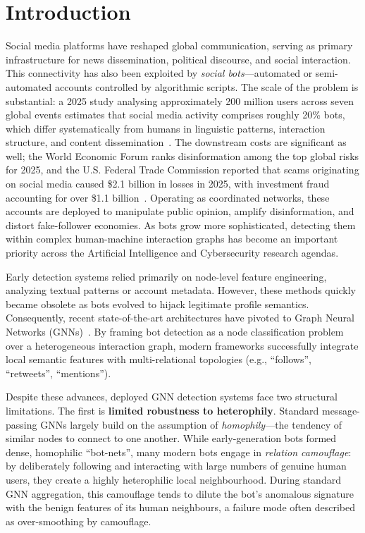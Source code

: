 \section{Introduction}

Social media platforms have reshaped global communication, serving as primary infrastructure for news dissemination, political discourse, and social interaction. This connectivity has also been exploited by \textit{social bots}---automated or semi-automated accounts controlled by algorithmic scripts. The scale of the problem is substantial: a 2025 study analysing approximately 200 million users across seven global events estimates that social media activity comprises roughly 20\% bots, which differ systematically from humans in linguistic patterns, interaction structure, and content dissemination~\cite{ng2025socialbots}. The downstream costs are significant as well; the World Economic Forum ranks disinformation among the top global risks for 2025, and the U.S. Federal Trade Commission reported that scams originating on social media caused \$2.1 billion in losses in 2025, with investment fraud accounting for over \$1.1 billion~\cite{ftc2026scams}. Operating as coordinated networks, these accounts are deployed to manipulate public opinion, amplify disinformation, and distort fake-follower economies. As bots grow more sophisticated, detecting them within complex human-machine interaction graphs has become an important priority across the Artificial Intelligence and Cybersecurity research agendas.

Early detection systems relied primarily on node-level feature engineering, analyzing textual patterns or account metadata. However, these methods quickly became obsolete as bots evolved to hijack legitimate profile semantics. Consequently, recent state-of-the-art architectures have pivoted to Graph Neural Networks (GNNs)~\cite{quang2026integrating}. By framing bot detection as a node classification problem over a heterogeneous interaction graph, modern frameworks successfully integrate local semantic features with multi-relational topologies (e.g., ``follows'', ``retweets'', ``mentions'').

Despite these advances, deployed GNN detection systems face two structural limitations. The first is \textbf{limited robustness to heterophily}. Standard message-passing GNNs largely build on the assumption of \textit{homophily}---the tendency of similar nodes to connect to one another. While early-generation bots formed dense, homophilic ``bot-nets'', many modern bots engage in \textit{relation camouflage}: by deliberately following and interacting with large numbers of genuine human users, they create a highly heterophilic local neighbourhood. During standard GNN aggregation, this camouflage tends to dilute the bot's anomalous signature with the benign features of its human neighbours, a failure mode often described as over-smoothing by camouflage.

